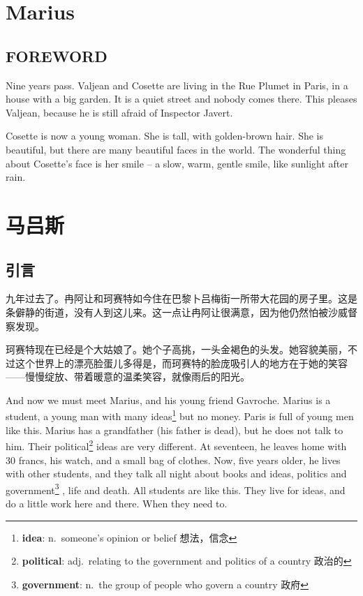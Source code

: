 \documentclass[fontset=ubuntu, zihao=5]{ctexart}
\begin{document}
\begin{paracol}{2}
\section{Marius}

\subsection*{FOREWORD}

Nine years pass. Valjean and Cosette are living in the Rue Plumet in Paris, in a house with a big garden. It is a quiet street and nobody comes there. This pleases Valjean, because he is still afraid of Inspector Javert.

Cosette is now a young woman. She is tall, with golden-brown hair. She is beautiful, but there are many beautiful faces in the world. The wonderful thing about Cosette's face is her smile – a slow, warm, gentle smile, like sunlight after rain.

\switchcolumn

\section*{马吕斯}

\subsection*{引言}

九年过去了。冉阿让和珂赛特如今住在巴黎卜吕梅街一所带大花园的房子里。这是条僻静的街道，没有人到这儿来。这一点让冉阿让很满意，因为他仍然怕被沙威督察发现。


珂赛特现在已经是个大姑娘了。她个子高挑，一头金褐色的头发。她容貌美丽，不过这个世界上的漂亮脸蛋儿多得是，而珂赛特的脸庞吸引人的地方在于她的笑容——慢慢绽放、带着暖意的温柔笑容，就像雨后的阳光。

\switchcolumn*

And now we must meet Marius, and his young friend Gavroche. Marius is a
student, a young man with many ideas\footnote{\textbf{idea}: n. someone's
  opinion or belief 想法，信念} but no money. Paris is full of young men
like this. Marius has a grandfather (his father is dead), but he does not
talk to him. Their political\footnote{\textbf{political}: adj. relating to
  the government and politics of a country 政治的} ideas are very different.
At seventeen, he leaves home with 30 francs, his watch, and a small bag of
clothes. Now, five years older, he lives with other students, and they talk
all night about books and ideas, politics and
government\footnote{\textbf{government}: n. the group of people who govern a
  country 政府} , life and death. All students are like this. They live for
ideas, and do a little work here and there. When they need to.


\end{paracol}
\end{document}
